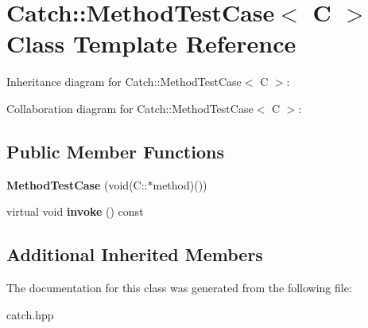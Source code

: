 \hypertarget{classCatch_1_1MethodTestCase}{}\section{Catch\+:\+:Method\+Test\+Case$<$ C $>$ Class Template Reference}
\label{classCatch_1_1MethodTestCase}


Inheritance diagram for Catch\+:\+:Method\+Test\+Case$<$ C $>$\+:


Collaboration diagram for Catch\+:\+:Method\+Test\+Case$<$ C $>$\+:
\subsection*{Public Member Functions}
\begin{DoxyCompactItemize}
\item 
{\bfseries Method\+Test\+Case} (void(C\+::$\ast$method)())\hypertarget{classCatch_1_1MethodTestCase_a7b043b85dae371358255dd9dc6582e7b}{}\label{classCatch_1_1MethodTestCase_a7b043b85dae371358255dd9dc6582e7b}

\item 
virtual void {\bfseries invoke} () const \hypertarget{classCatch_1_1MethodTestCase_a39cc4b760dd71adc3f7550bc1e7eb697}{}\label{classCatch_1_1MethodTestCase_a39cc4b760dd71adc3f7550bc1e7eb697}

\end{DoxyCompactItemize}
\subsection*{Additional Inherited Members}


The documentation for this class was generated from the following file\+:\begin{DoxyCompactItemize}
\item 
catch.\+hpp\end{DoxyCompactItemize}
